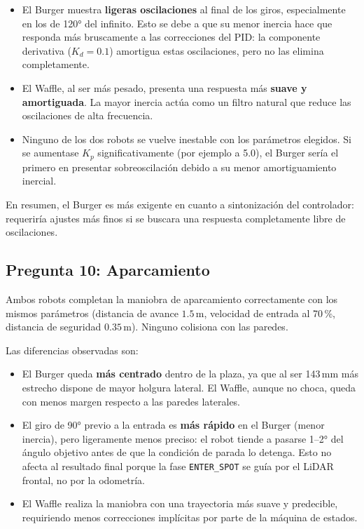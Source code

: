\begin{itemize}
	\item El Burger muestra \textbf{ligeras oscilaciones} al final de los giros, especialmente en los de 120° del infinito. Esto se debe a que su menor inercia hace que responda más bruscamente a las correcciones del PID: la componente derivativa ($K_d = 0.1$) amortigua estas oscilaciones, pero no las elimina completamente.
	
	\item El Waffle, al ser más pesado, presenta una respuesta más \textbf{suave y amortiguada}. La mayor inercia actúa como un filtro natural que reduce las oscilaciones de alta frecuencia.
	
	\item Ninguno de los dos robots se vuelve inestable con los parámetros elegidos. Si se aumentase $K_p$ significativamente (por ejemplo a 5.0), el Burger sería el primero en presentar sobreoscilación debido a su menor amortiguamiento inercial.
\end{itemize}

En resumen, el Burger es más exigente en cuanto a sintonización del controlador: requeriría ajustes más finos si se buscara una respuesta completamente libre de oscilaciones.

\subsection*{Pregunta 10: Aparcamiento}

Ambos robots completan la maniobra de aparcamiento correctamente con los mismos parámetros (distancia de avance $1.5\,\text{m}$, velocidad de entrada al 70\,\%, distancia de seguridad $0.35\,\text{m}$). Ninguno colisiona con las paredes.

Las diferencias observadas son:

\begin{itemize}
	\item El Burger queda \textbf{más centrado} dentro de la plaza, ya que al ser 143\,mm más estrecho dispone de mayor holgura lateral. El Waffle, aunque no choca, queda con menos margen respecto a las paredes laterales.
	
	\item El giro de 90° previo a la entrada es \textbf{más rápido} en el Burger (menor inercia), pero ligeramente menos preciso: el robot tiende a pasarse 1--2° del ángulo objetivo antes de que la condición de parada lo detenga. Esto no afecta al resultado final porque la fase \texttt{ENTER\_SPOT} se guía por el LiDAR frontal, no por la odometría.
	
	\item El Waffle realiza la maniobra con una trayectoria más suave y predecible, requiriendo menos correcciones implícitas por parte de la máquina de estados.
\end{itemize}

